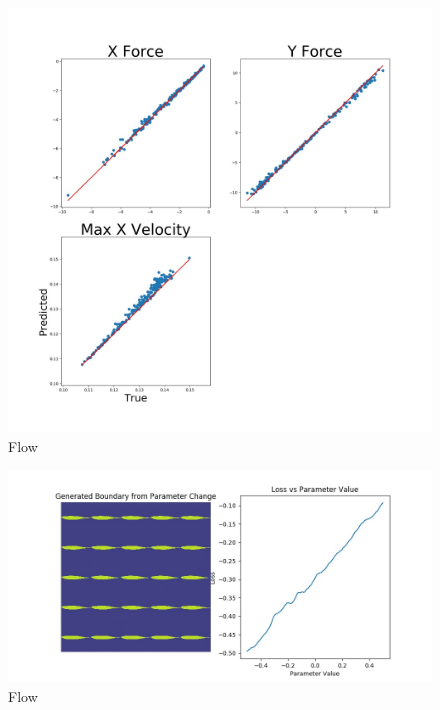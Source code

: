 \documentclass{article} %
\begin{document}
\begin{figure}[h]
\begin{center}
\includegraphics[scale=0.14]{../test/figs/flow_accuracy_2d.jpeg}
\end{center}
\caption{Flow}
\end{figure}

\begin{figure}[h]
\begin{center}
\includegraphics[scale=0.14]{../test/figs/boundary_space_explort.jpeg}
\end{center}
\caption{Flow}
\end{figure}
\end{document}
